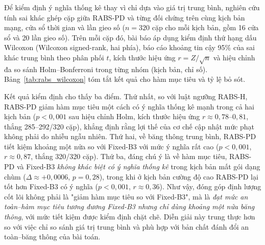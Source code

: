 \documentclass[10pt]{article}
\begin{document}
\begin{table}[ht]
\centering
\caption{So sánh chính sách điều khiển băng thông trong điều kiện mất gói dạng chùm và mất gói dạng chùm cường độ cao. Các giá trị là trung bình trên các cửa sổ và 20 lần gieo số; khoảng tin cậy 95\% được lưu trong dữ liệu bổ sung.}
\label{tab:rabs_summary}
\resizebox{\linewidth}{!}{}
\end{table}

\begin{table}[ht]
\centering
\caption{Kết quả trên các cửa sổ 9--15 được tách riêng để kiểm tra sau khi cố định cấu hình chính sách. Các giá trị là trung bình trên 20 lần gieo số; khoảng tin cậy 95\% được lưu trong dữ liệu bổ sung.}
\label{tab:rabs_holdout_summary}
\resizebox{0.96\linewidth}{!}{}
\end{table}

Để kiểm định ý nghĩa thống kê thay vì chỉ dựa vào giá trị trung bình, nghiên cứu tính sai khác ghép cặp giữa RABS-PD và từng đối chứng trên cùng kịch bản mạng, cửa sổ thời gian và lần gieo số ($n=320$ cặp cho mỗi kịch bản, gồm 16 cửa sổ và 20 lần gieo số). Trên mỗi cặp đó, bài báo áp dụng kiểm định thứ hạng dấu Wilcoxon (Wilcoxon signed-rank, hai phía), báo cáo khoảng tin cậy 95\% của sai khác trung bình theo phân phối $t$, kích thước hiệu ứng $r=Z/\sqrt{n}$ và hiệu chỉnh đa so sánh Holm--Bonferroni trong từng nhóm (kịch bản, chỉ số). Bảng~\ref{tab:rabs_wilcoxon} tóm tắt kết quả cho hàm mục tiêu và tỷ lệ bỏ sót.

Kết quả kiểm định cho thấy ba điểm. Thứ nhất, so với luật ngưỡng RABS-H, RABS-PD giảm hàm mục tiêu một cách có ý nghĩa thống kê mạnh trong cả hai kịch bản ($p<0{,}001$ sau hiệu chỉnh Holm, kích thước hiệu ứng $r\approx0{,}78$--$0{,}81$, thắng 285--292/320 cặp), khẳng định rằng lợi thế của cơ chế cập nhật mức phạt không phải do nhiễu ngẫu nhiên. Thứ hai, về băng thông trung bình, RABS-PD tiết kiệm khoảng một nửa so với Fixed-B3 với mức ý nghĩa rất cao ($p<0{,}001$, $r\approx0{,}87$, thắng 320/320 cặp). Thứ ba, đáng chú ý là về hàm mục tiêu, RABS-PD và Fixed-B3 \emph{không khác biệt có ý nghĩa thống kê} trong kịch bản mất gói dạng chùm ($\Delta\approx+0{,}0006$, $p=0{,}28$), trong khi ở kịch bản cường độ cao RABS-PD lại tốt hơn Fixed-B3 có ý nghĩa ($p<0{,}001$, $r\approx0{,}36$). Như vậy, đóng góp định lượng cốt lõi không phải là "giảm hàm mục tiêu so với Fixed-B3", mà là \emph{đạt mức an toàn--hàm mục tiêu tương đương Fixed-B3 nhưng chỉ dùng khoảng một nửa băng thông}, với mức tiết kiệm được kiểm định chặt chẽ. Diễn giải này trung thực hơn so với việc chỉ so sánh giá trị trung bình và phù hợp với bản chất đánh đổi an toàn--băng thông của bài toán.
\end{document}
